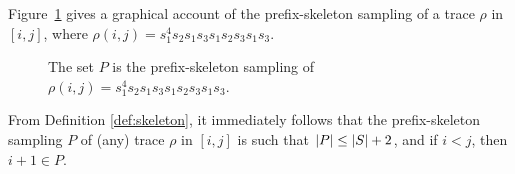 \begin{example}
Figure~\ref{fig:pref} gives a graphical account of the prefix-skeleton sampling of a trace $\rho$ in $[i,j]$, where $\rho(i,j)=s_1^4s_2s_1s_3s_1\allowbreak s_2s_3s_1s_3$.

\begin{figure}[H]
    \centering
    \caption{The set $P$ is the prefix-skeleton sampling of $\rho(i,j)=s_1^4s_2s_1s_3s_1\allowbreak s_2s_3s_1s_3$.}
    \label{fig:pref}
\end{figure}
\end{example}

From Definition \ref{def:skeleton}, it immediately follows that the prefix-skeleton sampling $P$ of (any) trace $\rho$ in $[i,j]$ is such that $|P|\leq |S|+2$, and if $i<j$, then $i+1\in P$.

